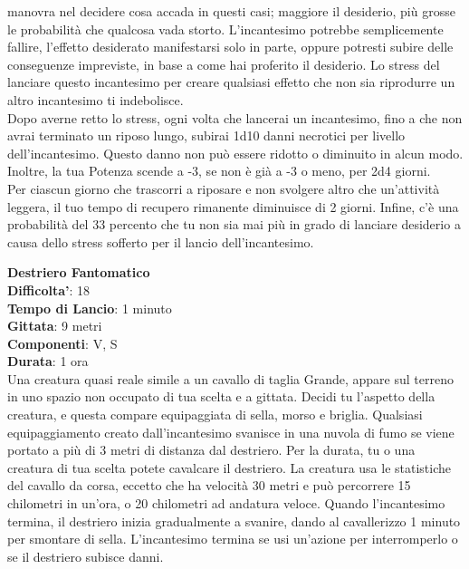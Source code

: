 \begin{multicols}{2}
manovra nel decidere cosa accada in questi casi; maggiore il desiderio, più grosse le probabilità che qualcosa vada storto. L’incantesimo potrebbe semplicemente fallire, l’effetto desiderato manifestarsi solo in parte, oppure potresti subire delle conseguenze impreviste, in base a come hai proferito il desiderio. Lo stress del lanciare questo incantesimo per creare qualsiasi effetto che non sia riprodurre un altro incantesimo ti indebolisce.\\
Dopo averne retto lo stress, ogni volta che lancerai un incantesimo, fino a che non avrai terminato un riposo lungo, subirai 1d10 danni necrotici per livello dell’incantesimo. Questo danno non può essere ridotto o diminuito in alcun modo. Inoltre, la tua Potenza scende a -3, se non è già a -3 o meno, per 2d4 giorni.\\
Per ciascun giorno che trascorri a riposare e non svolgere altro che un’attività leggera, il tuo tempo di recupero rimanente diminuisce di 2 giorni. Infine, c’è una probabilità del 33 percento che tu non sia mai più in grado di lanciare desiderio a causa dello stress sofferto per il lancio dell’incantesimo.

\medskip\textbf{Destriero Fantomatico}\\
\textbf{Difficolta'}: 18\\
\textbf{Tempo di Lancio}: 1 minuto\\
\textbf{Gittata}: 9 metri\\
\textbf{Componenti}: V, S\\
\textbf{Durata}: 1 ora\\
Una creatura quasi reale simile a un cavallo di taglia Grande, appare sul terreno in uno spazio non occupato di tua scelta e a gittata. Decidi tu l’aspetto della creatura, e questa compare equipaggiata di sella, morso e briglia. Qualsiasi equipaggiamento creato dall’incantesimo svanisce in una nuvola di fumo se viene portato a più di 3 metri di distanza dal destriero. Per la durata, tu o una creatura di tua scelta potete cavalcare il destriero. La creatura usa le statistiche del cavallo da corsa, eccetto che ha velocità 30 metri e può percorrere 15 chilometri in un’ora, o 20 chilometri ad andatura veloce. Quando l’incantesimo termina, il destriero inizia gradualmente a svanire, dando al cavallerizzo 1 minuto per smontare di sella. L’incantesimo termina se usi un’azione per interromperlo o se il destriero subisce danni.


\end{multicols}
